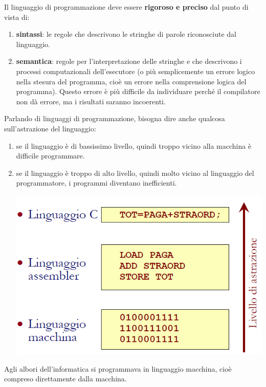 \documentclass[
  paper=a4,
  oneside  ,captions=tableheading
]{scrbook}
\providecommand{\tightlist}{%
  \setlength{\itemsep}{0pt}\setlength{\parskip}{0pt}}
\begin{document}
Il linguaggio di programmazione deve essere \textbf{rigoroso e preciso}
dal punto di vista di:

\begin{enumerate}
\def\labelenumi{\arabic{enumi}.}
\tightlist
\item
  \textbf{sintassi}: le regole che descrivono le stringhe di parole
  riconosciute dal linguaggio.
\item
  \textbf{semantica}: regole per l'interpretazione delle stringhe e che
  descrivono i processi computazionali dell'esecutore (o più
  semplicemente un errore logico nella stesura del programma, cioè un
  errore nella comprensione logica del programma). Questo errore è più
  difficile da individuare perché il compilatore non dà errore, ma i
  risultati saranno incoerenti.
\end{enumerate}

Parlando di linguaggi di programmazione, bisogna dire anche qualcosa
sull'astrazione del linguaggio:

\begin{enumerate}
\def\labelenumi{\arabic{enumi}.}
\item
  se il linguaggio è di bassissimo livello, quindi troppo vicino alla
  macchina è difficile programmare.
\item
  se il linguaggio è troppo di alto livello, quindi molto vicino al
  linguaggio del programmatore, i programmi diventano inefficienti.

  \includegraphics{./image/image-20201111001022024.png}
\end{enumerate}

Agli albori dell'informatica si programmava in linguaggio macchina, cioè
compreso direttamente dalla macchina.
\end{document}
